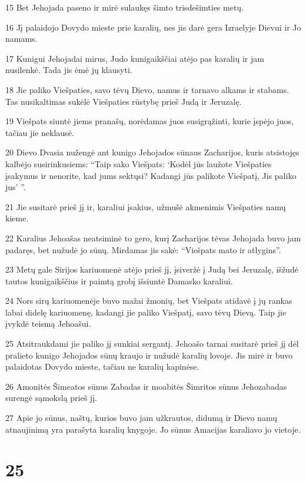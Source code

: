 \par 15 Bet Jehojada paseno ir mirė sulaukęs šimto trisdešimties metų. 
\par 16 Jį palaidojo Dovydo mieste prie karalių, nes jis darė gera Izraelyje Dievui ir Jo namams. 
\par 17 Kunigui Jehojadai mirus, Judo kunigaikščiai atėjo pas karalių ir jam nusilenkė. Tada jis ėmė jų klausyti. 
\par 18 Jie paliko Viešpaties, savo tėvų Dievo, namus ir tarnavo alkams ir stabams. Tas nusikaltimas sukėlė Viešpaties rūstybę prieš Judą ir Jeruzalę. 
\par 19 Viešpats siuntė jiems pranašų, norėdamas juos susigrąžinti, kurie įspėjo juos, tačiau jie neklausė. 
\par 20 Dievo Dvasia nužengė ant kunigo Jehojados sūnaus Zacharijos, kuris atsistojęs kalbėjo susirinkusiems: “Taip sako Viešpats: ‘Kodėl jūs laužote Viešpaties įsakymus ir nenorite, kad jums sektųsi? Kadangi jūs palikote Viešpatį, Jis paliko jus’ ”. 
\par 21 Jie susitarė prieš jį ir, karaliui įsakius, užmušė akmenimis Viešpaties namų kieme. 
\par 22 Karalius Jehoašas neatsiminė to gero, kurį Zacharijos tėvas Jehojada buvo jam padaręs, bet nužudė jo sūnų. Mirdamas jis sakė: “Viešpats mato ir atlygins”. 
\par 23 Metų gale Sirijos kariuomenė atėjo prieš jį, įsiveržė į Judą bei Jeruzalę, išžudė tautos kunigaikščius ir paimtą grobį išsiuntė Damasko karaliui. 
\par 24 Nors sirų kariuomenėje buvo mažai žmonių, bet Viešpats atidavė į jų rankas labai didelę kariuomenę, kadangi jie paliko Viešpatį, savo tėvų Dievą. Taip jie įvykdė teismą Jehoašui. 
\par 25 Atsitraukdami jie paliko jį sunkiai sergantį. Jehoašo tarnai susitarė prieš jį dėl pralieto kunigo Jehojados sūnų kraujo ir nužudė karalių lovoje. Jis mirė ir buvo palaidotas Dovydo mieste, tačiau ne karalių kapinėse. 
\par 26 Amonitės Šimeatos sūnus Zabadas ir moabitės Šimritos sūnus Jehozabadas surengė sąmokslą prieš jį. 
\par 27 Apie jo sūnus, naštų, kurios buvo jam užkrautos, didumą ir Dievo namų atnaujinimą yra parašyta karalių knygoje. Jo sūnus Amacijas karaliavo jo vietoje.



\chapter{25}

